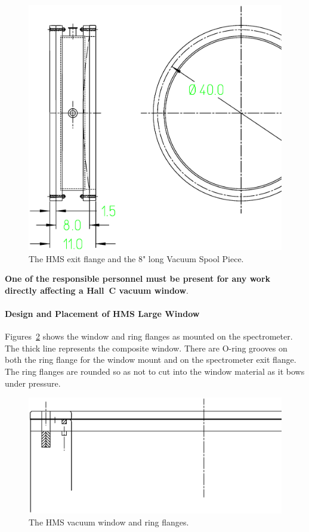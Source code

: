 {%
\begin{figure}
\includegraphics[width=6in]{figHMSflange}
\caption{The HMS exit flange and the 8" long Vacuum Spool Piece. \label{fig:hms_flange}}
\end{figure}

{\bf One of the responsible personnel must be present for
any work directly affecting a Hall~C vacuum window}.

\paragraph{Design and Placement of HMS Large Window}


Figures~\ref{fig:hms_window} shows the
window and ring flanges as mounted on the spectrometer. The thick
line represents the composite window. There are O-ring grooves on both the
ring flange for the window mount and on the spectrometer exit flange.
The ring flanges are rounded so as not to cut into the window material
as
it bows under pressure.

\begin{figure}
\includegraphics[width=6in]{figHMSwindow}
\caption{The HMS vacuum window and ring flanges. \label{fig:hms_window}}
\end{figure}

}
